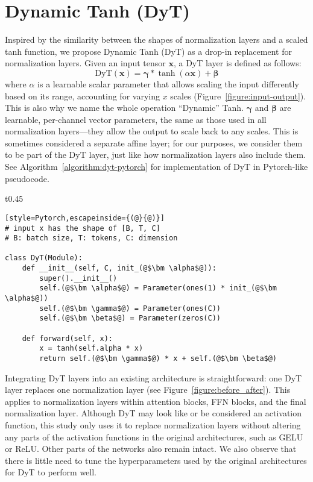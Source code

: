 \documentclass[]{fairmeta}
\def\vx{{\bm{x}}}
\begin{document}
\section{Dynamic Tanh (DyT)}

Inspired by the similarity between the shapes of normalization layers and a scaled tanh function, we propose Dynamic Tanh (DyT) as a drop-in replacement for normalization layers. Given an input tensor $\vx$, a DyT layer is defined as follows:
\begin{equation}
\mathrm{DyT}(\vx) = \bm{\gamma} * \tanh(\alpha \vx) + \bm{\beta}
\end{equation}
where $\alpha$ is a learnable scalar parameter that allows scaling the input differently based on its range, accounting for varying $x$ scales (Figure~\ref{figure:input-output}). This is also why we name the whole operation ``Dynamic'' Tanh.
$\bm{\gamma}$ and $\bm{\beta}$ are learnable, per-channel vector parameters, the same as those used in all normalization layers---they allow the output to scale back to any scales. This is sometimes considered a separate affine layer; for our purposes, we consider them to be part of the DyT layer, just like how normalization layers also include them. See Algorithm~\ref{algorithm:dyt-pytorch} for implementation of DyT in Pytorch-like pseudocode.




\begin{wrapfigure}[11]{t}{0.45\textwidth}
\centering
\begin{minipage}{\linewidth}
\vspace*{-0.85cm}
\begin{algorithm}[H]
\begin{lstlisting}[style=Pytorch,escapeinside={(@}{@)}]
# input x has the shape of [B, T, C]
# B: batch size, T: tokens, C: dimension 

class DyT(Module):
    def __init__(self, C, init_(@$\bm \alpha$@)):
        super().__init__()
        self.(@$\bm \alpha$@) = Parameter(ones(1) * init_(@$\bm \alpha$@))
        self.(@$\bm \gamma$@) = Parameter(ones(C))
        self.(@$\bm \beta$@) = Parameter(zeros(C))

    def forward(self, x):
        x = tanh(self.alpha * x)
        return self.(@$\bm \gamma$@) * x + self.(@$\bm \beta$@)
\end{lstlisting}
\caption{Pseudocode of DyT layer.}
\label{algorithm:dyt-pytorch}
\end{algorithm}
\end{minipage}
\end{wrapfigure}
Integrating DyT layers into an existing architecture is straightforward: one DyT layer replaces one normalization layer (see Figure~\ref{figure:before_after}). This applies to normalization layers within attention blocks, FFN blocks, and the final normalization layer. Although DyT may look like or be considered an activation function, this study only uses it to replace normalization layers without altering any parts of the activation functions in the original architectures, such as GELU or ReLU. Other parts of the networks also remain intact. We also observe that there is little need to tune the hyperparameters used by the original architectures for DyT to perform well.
\end{document}
